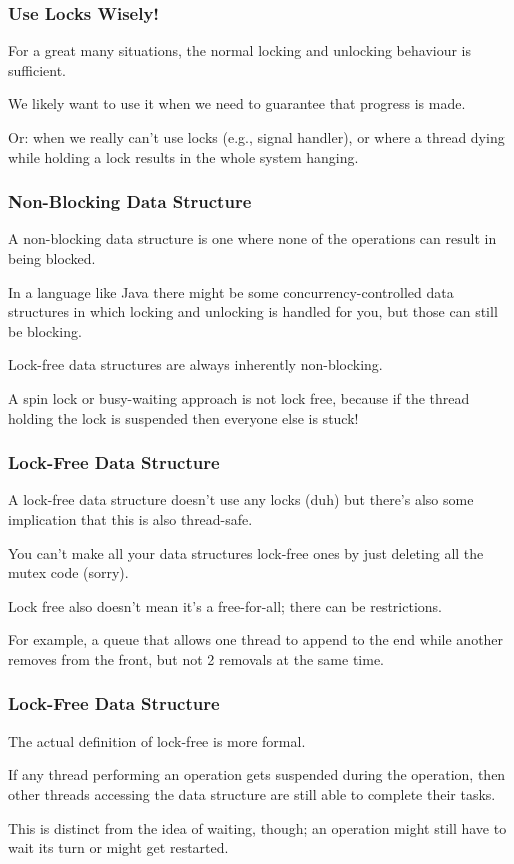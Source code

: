 \begin{frame}
\frametitle{Use Locks Wisely!}

For a great many situations, the normal locking and unlocking behaviour is sufficient.

We likely want to use it when we need to guarantee that progress is made. 

Or: when we really can't use locks (e.g., signal handler), or where a thread dying while holding a lock results in the whole system hanging.

\end{frame}

\begin{frame}
\frametitle{Non-Blocking Data Structure}

A non-blocking data structure is one where none of the operations can result in being blocked. 

In a language like Java there might be some concurrency-controlled data structures in which locking and unlocking is handled for you, but those can still be blocking. 

Lock-free data structures are always inherently non-blocking. 

A spin lock or busy-waiting approach is not lock free, because if the thread holding the lock is suspended then everyone else is stuck!

\end{frame}

\begin{frame}
\frametitle{Lock-Free Data Structure}
A lock-free data structure doesn't use any locks (duh) but there's also some implication that this is also thread-safe.

You can't make all your data structures lock-free ones by just deleting all the mutex code (sorry). 

Lock free also doesn't mean it's a free-for-all; there can be restrictions. 

For example, a queue that allows one thread to append to the end while another removes from the front, but not 2 removals at the same time.
\end{frame}



\begin{frame}
\frametitle{Lock-Free Data Structure}

The actual definition of lock-free is more formal. 

If any thread performing an operation gets suspended during the operation, then other threads accessing the data structure are still able to complete their tasks.

This is distinct from the idea of waiting, though; an operation might still have to wait its turn or might get restarted.

\end{frame}



